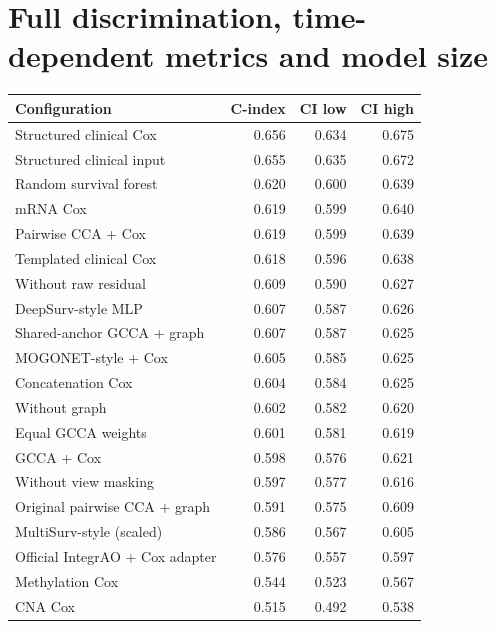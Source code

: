 \documentclass[10pt]{article}
\begin{document}
\section{Full discrimination, time-dependent metrics and model size}
\begin{center}
\footnotesize
\begin{tabular}{lrrr}\hline
Configuration & C-index & CI low & CI high\\\hline
Structured clinical Cox & 0.656 & 0.634 & 0.675\\
Structured clinical input & 0.655 & 0.635 & 0.672\\
Random survival forest & 0.620 & 0.600 & 0.639\\
mRNA Cox & 0.619 & 0.599 & 0.640\\
Pairwise CCA + Cox & 0.619 & 0.599 & 0.639\\
Templated clinical Cox & 0.618 & 0.596 & 0.638\\
Without raw residual & 0.609 & 0.590 & 0.627\\
DeepSurv-style MLP & 0.607 & 0.587 & 0.626\\
Shared-anchor GCCA + graph & 0.607 & 0.587 & 0.625\\
MOGONET-style + Cox & 0.605 & 0.585 & 0.625\\
Concatenation Cox & 0.604 & 0.584 & 0.625\\
Without graph & 0.602 & 0.582 & 0.620\\
Equal GCCA weights & 0.601 & 0.581 & 0.619\\
GCCA + Cox & 0.598 & 0.576 & 0.621\\
Without view masking & 0.597 & 0.577 & 0.616\\
Original pairwise CCA + graph & 0.591 & 0.575 & 0.609\\
MultiSurv-style (scaled) & 0.586 & 0.567 & 0.605\\
Official IntegrAO + Cox adapter & 0.576 & 0.557 & 0.597\\
Methylation Cox & 0.544 & 0.523 & 0.567\\
CNA Cox & 0.515 & 0.492 & 0.538\\
\hline\end{tabular}
\end{center}
\end{document}
